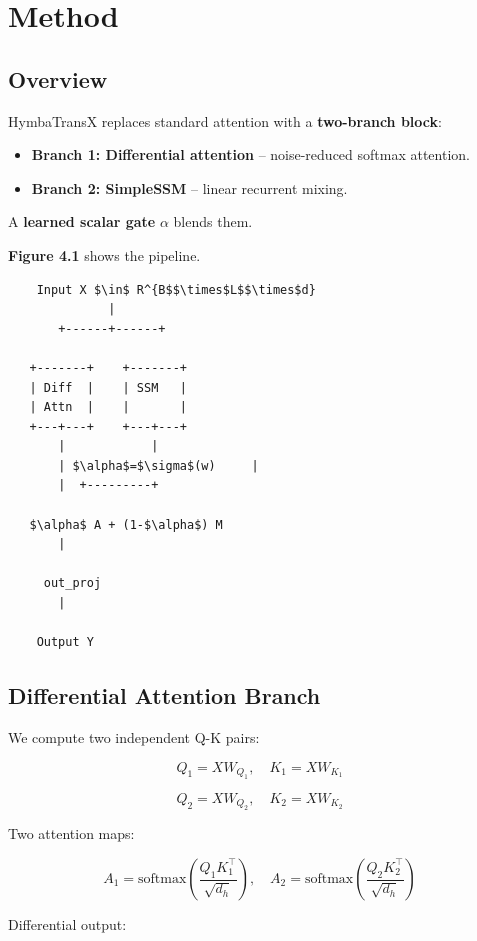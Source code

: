\section{Method}

\subsection{Overview}

HymbaTransX replaces standard attention with a \textbf{two-branch block}:

\begin{itemize}
\item \textbf{Branch 1: Differential attention} -- noise-reduced softmax attention.
\item \textbf{Branch 2: SimpleSSM} -- linear recurrent mixing.

\end{itemize}
A \textbf{learned scalar gate} $\alpha$ blends them.

\textbf{Figure 4.1} shows the pipeline.

\begin{lstlisting}
    Input X $\in$ R^{B$$\times$L$$\times$d}
              |
       +------+------+
                      
   +-------+    +-------+
   | Diff  |    | SSM   |
   | Attn  |    |       |
   +---+---+    +---+---+
       |            |
       | $\alpha$=$\sigma$(w)     |
       |  +---------+
           
   $\alpha$ A + (1-$\alpha$) M
       |
        
     out_proj
       |
        
    Output Y
\end{lstlisting}

\subsection{Differential Attention Branch}

We compute two independent Q-K pairs:

\[
Q_1 = X W_{Q_1}, \quad K_1 = X W_{K_1}
\tag{4.1}
\]

\[
Q_2 = X W_{Q_2}, \quad K_2 = X W_{K_2}
\tag{4.2}
\]

Two attention maps:

\[
A_1 = \text{softmax}\!\left(\frac{Q_1 K_1^\top}{\sqrt{d_h}}\right), \quad
A_2 = \text{softmax}\!\left(\frac{Q_2 K_2^\top}{\sqrt{d_h}}\right)
\tag{4.3}
\]

Differential output:

